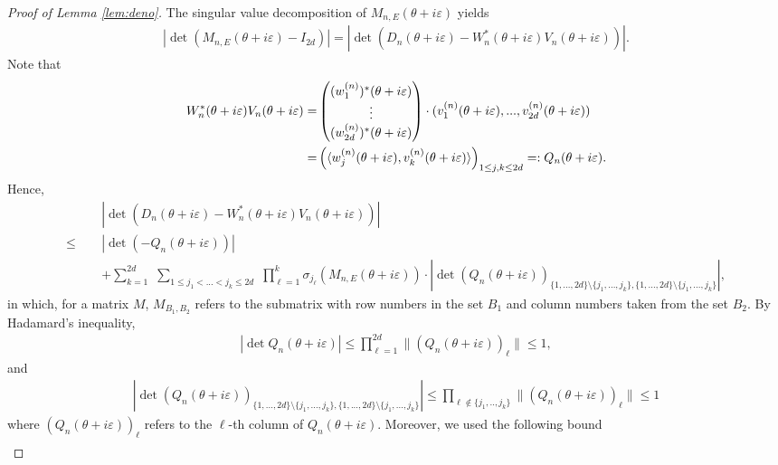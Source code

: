 \documentclass[11pt]{amsart}
\begin{document}
\begin{proof}[Proof of Lemma \ref{lem:deno}]
The singular value decomposition of $M_{n,E}(\theta+i\varepsilon)$ yields
\begin{align}\label{eq:M=DWV}
    |\det(M_{n,E}(\theta+i\varepsilon)-I_{2d})|=|\det (D_n(\theta+i\varepsilon)-W_{n}^*(\theta+i\varepsilon)V_{n}(\theta+i\varepsilon))|.
\end{align}
Note that
\begin{align}\label{eq:WV=Q}
    W_{n}^*(\theta+i\varepsilon)V_{n}(\theta+i\varepsilon)
    =&\left(\begin{matrix} (w_{1}^{(n)})^*(\theta+i\varepsilon)\\ \vdots\\ (w_{2d}^{(n)})^*(\theta+i\varepsilon)\end{matrix}\right)\cdot (v_{1}^{(n)}(\theta+i\varepsilon),...,v_{2d}^{(n)}(\theta+i\varepsilon))\notag\\
    =&
    \left(\langle w_{j}^{(n)}(\theta+i\varepsilon), v_{k}^{(n)}(\theta+i\varepsilon)\rangle\right)_{1\leq j,k\leq 2d}
    =:Q_n(\theta+i\varepsilon).
\end{align}
Hence, 
\begin{align}\label{eq:D-UU}
\qquad &|\det(D_n(\theta+i\varepsilon)-W_{n}^*(\theta+i\varepsilon)V_{n}(\theta+i\varepsilon))|\\
\leq &|\det(-Q_n(\theta+i\varepsilon))|\\
&+\sum_{k=1}^{2d}\,\, \sum_{1\leq j_1<...<j_k\leq 2d}\,\, \prod_{\ell=1}^k \sigma_{j_{\ell}}(M_{n,E}(\theta+i\varepsilon))\cdot \left|\det (Q_n(\theta+i\varepsilon))_{\{1,...,2d\}\setminus \{j_1,...,j_k\}, \{1,...,2d\}\setminus \{j_1,...,j_k\}}\right|,
\end{align}
in which, for a matrix $M$, $M_{B_1,B_2}$ refers to the submatrix with row numbers in the set $B_1$ and column numbers taken from the set $B_2$.
By Hadamard's inequality,
\begin{align}\label{eq:detQ_0}
|\det Q_n(\theta+i\varepsilon)|\leq \prod_{\ell=1}^{2d} \|(Q_n(\theta+i\varepsilon))_{\ell}\|\leq 1,
\end{align}
and
\begin{align}\label{eq:detQ_1}
    \left|\det (Q_n(\theta+i\varepsilon))_{\{1,...,2d\}\setminus \{j_1,...,j_k\}, \{1,...,2d\}\setminus \{j_1,...,j_k\}}\right|\leq \prod_{\ell\notin \{j_1,..,j_k\}} \| (Q_n(\theta+i\varepsilon))_{\ell}\|\leq 1
\end{align}
where $(Q_n(\theta+i\varepsilon))_{\ell}$ refers to the $\ell$-th column of $Q_n(\theta+i\varepsilon)$. Moreover,   we used the following bound
\begin{align}\label{eq:Q<1}

\end{align}
\end{proof}
\end{document}
